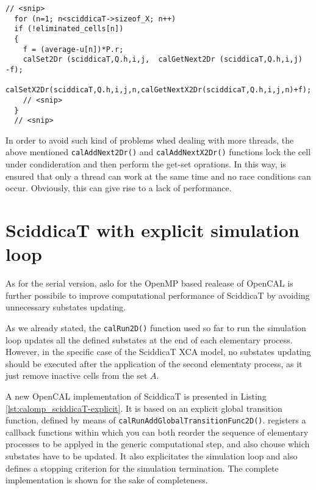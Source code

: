 \begin{lstlisting}[float,floatplacement=H, label=lst:get-set, caption=Example of non atomic operation made of a combination of get-set calls.]
  // <snip>
  for (n=1; n<sciddicaT->sizeof_X; n++)
  if (!eliminated_cells[n])
  {
    f = (average-u[n])*P.r;
    calSet2Dr (sciddicaT,Q.h,i,j,  calGetNext2Dr (sciddicaT,Q.h,i,j)  -f);
    calSetX2Dr(sciddicaT,Q.h,i,j,n,calGetNextX2Dr(sciddicaT,Q.h,i,j,n)+f);
    // <snip>
  }
  // <snip>
\end{lstlisting}  

In order to avoid such kind of problems whed dealing with more
threads, the above mentioned \verb'calAddNext2Dr()' and
\verb'calAddNextX2Dr()' functions lock the cell under condideration
and then perform the get-set oprations. In this way, is ensured that
only a thread can work at the same time and no race conditions can
occur. Obviously, this can give rise to a lack of performance.


\section{SciddicaT with explicit simulation loop}

As for the serial version, aslo for the OpenMP based realease of OpenCAL is
further possibile to improve computational performance of SciddicaT by
avoiding unnecessary substates updating.

As we already stated, the \verb'calRun2D()' function used so far to
run the simulation loop updates all the defined substates at the end
of each elementary process. However, in the specific case of the
SciddicaT XCA model, no substates updating should be executed after
the application of the second elementaty process, as it just remove
inactive cells from the set $A$.

A new OpenCAL implementation of SciddicaT is presented in Listing
\ref{lst:calomp_sciddicaT-explicit}. It is based on an explicit global
transition function, defined by means of \verb'calRunAddGlobalTransitionFunc2D()'. registers a callback functions within which you can both reorder the sequence of elementary processes to be applyed in the generic computational step, and also chouse which substates have to be updated. It also explicitates the simulation loop and also
defines a stopping criterion for the simulation termination. The
complete implementation is shown for the sake of completeness.






